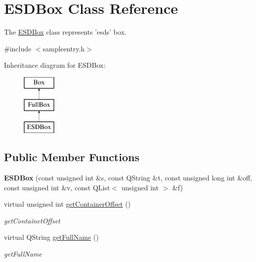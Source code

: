 \hypertarget{class_e_s_d_box}{\section{E\-S\-D\-Box Class Reference}
\label{class_e_s_d_box}
}


The \hyperlink{class_e_s_d_box}{E\-S\-D\-Box} class represents 'esds' box.  




{\ttfamily \#include $<$sampleentry.\-h$>$}

Inheritance diagram for E\-S\-D\-Box\-:\begin{figure}[H]
\begin{center}
\leavevmode
\includegraphics[height=3.000000cm]{class_e_s_d_box}
\end{center}
\end{figure}
\subsection*{Public Member Functions}
\begin{DoxyCompactItemize}
\item 
\hypertarget{class_e_s_d_box_ab58d178065b70c886890f7f6f0b8e407}{{\bfseries E\-S\-D\-Box} (const unsigned int \&s, const Q\-String \&t, const unsigned long int \&off, const unsigned int \&v, const Q\-List$<$ unsigned int $>$ \&f)}\label{class_e_s_d_box_ab58d178065b70c886890f7f6f0b8e407}

\item 
virtual unsigned int \hyperlink{class_e_s_d_box_a17698371f055f5deec6e9819c9b302cd}{get\-Container\-Offset} ()
\begin{DoxyCompactList}\small\item\em get\-Containet\-Offset \end{DoxyCompactList}\item 
virtual Q\-String \hyperlink{class_e_s_d_box_a9e610dce6e72228e08fcbdfca0177c85}{get\-Full\-Name} ()
\begin{DoxyCompactList}\small\item\em get\-Full\-Name \end{DoxyCompactList}\end{DoxyCompactItemize}
